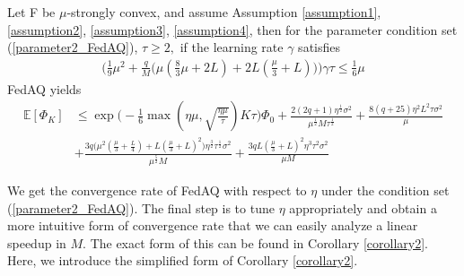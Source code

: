 \documentclass[11pt]{article}
\begin{document}
\begin{theorem} \label{theorem2}
    Let F be $\mu$-strongly convex, and assume Assumption \ref{assumption1}, \ref{assumption2}, \ref{assumption3}, \ref{assumption4}, then for the parameter condition set (\ref{parameter2_FedAQ}), $\tau \geq 2, $ if the learning rate $\gamma$ satisfies
    \begin{align} \label{condition2}
        \bigg( \frac{1}{9}\mu^2 +\frac{q}{M}\Big( \mu(\frac{8}{3}\mu +2L) + 2L(\frac{\mu}{3}+L)\Big)\bigg)\gamma\tau \leq \frac{1}{6}\mu
    \end{align}
    FedAQ yields
    \begin{align*}
        \mathbb{E}[\Phi_K] &\leq \exp{\Big(-\frac{1}{6}\max(\eta\mu, \sqrt{\frac{\eta\mu}{\tau}})K\tau\Big)} \Phi_0 + \frac{2(2q+1)\eta^{\frac{1}{2}}\sigma^2}{\mu^{\frac{1}{2}}M\tau^{\frac{1}{2}}} + \frac{8(q+25)\eta^2 L^2\tau\sigma^2}{\mu} \\
        &+ \frac{3q\Big(\mu^2(\frac{\mu}{3}+\frac{L}{4}) + L(\frac{\mu}{3}+L)^2\Big)\eta^{\frac{3}{2}}\tau^{\frac{1}{2}}\sigma^2}{\mu^{\frac{5}{2}}M} + \frac{3qL(\frac{\mu}{3}+L)^2 \eta^3\tau^2\sigma^2}{\mu M}
    \end{align*}
\end{theorem}

We get the convergence rate of FedAQ with respect to $\eta$ under the condition set (\ref{parameter2_FedAQ}). The final step is to tune $\eta$ appropriately and obtain a more intuitive form of convergence rate that we can easily analyze a linear speedup in $M$. The exact form of this can be found in Corollary \ref{corollary2}. Here, we introduce the simplified form of Corollary \ref{corollary2}.
\end{document}
